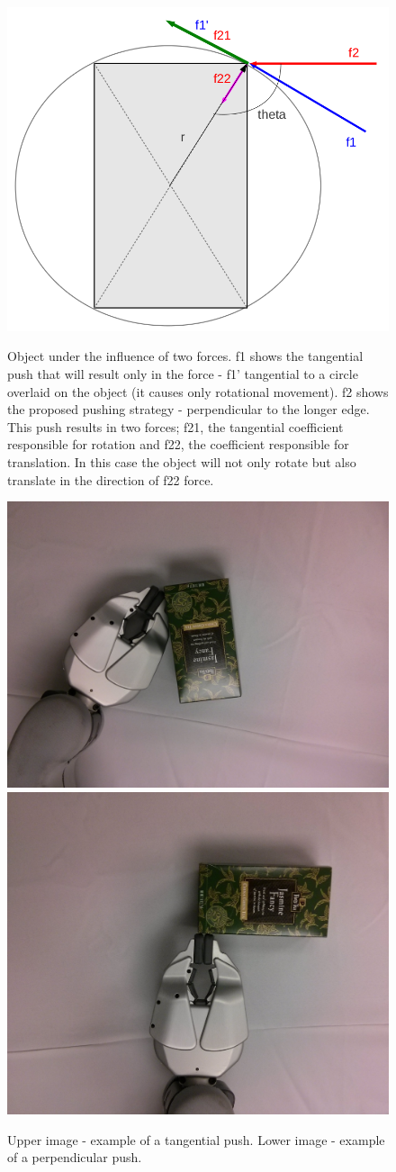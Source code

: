 \begin{figure}
\centering 

\includegraphics[width=0.5\columnwidth]{figures/rectangle-angle.png}\\


\caption[Object under the influence of two forces.]{Object under the influence of two forces. f1 shows the tangential push that will result only in the force - f1' tangential to a circle overlaid on the object (it causes only rotational movement). f2 shows the proposed pushing strategy - perpendicular to the longer edge. This push results in two forces; f21, the tangential coefficient responsible for rotation and f22, the coefficient responsible for translation. In this case the object will not only rotate but also translate in the direction of f22 force.  }
\label{fig:angles-rectangle}
\end{figure}




\begin{figure}
\centering 

\includegraphics[width=0.4\columnwidth]{figures/peets-tangential.jpg}\\
\includegraphics[width=0.4\columnwidth]{figures/peets-perpendicular.jpg}\\


\caption{Upper image - example of a tangential push. Lower image - example of a perpendicular push.}
\label{fig:tangential-example}
\end{figure}

